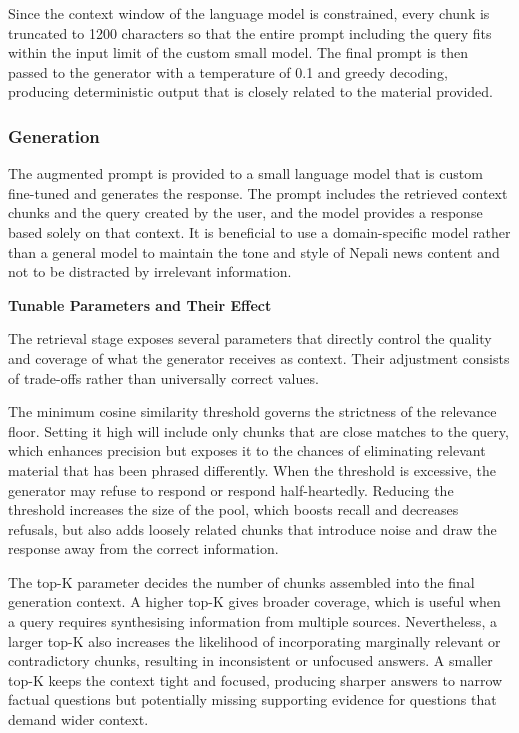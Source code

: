 Since the context window of the language model is constrained, every chunk is truncated to 1200 characters so that the entire prompt including the query fits within the input limit of the custom small model. The final prompt is then passed to the generator with a temperature of 0.1 and greedy decoding, producing deterministic output that is closely related to the material provided.

\subsubsection{Generation}

The augmented prompt is provided to a small language model that is custom fine-tuned and generates the response. The prompt includes the retrieved context chunks and the query created by the user, and the model provides a response based solely on that context. It is beneficial to use a domain-specific model rather than a general model to maintain the tone and style of Nepali news content and not to be distracted by irrelevant information.

\textbf{Tunable Parameters and Their Effect}

The retrieval stage exposes several parameters that directly control the quality and coverage of what the generator receives as context. Their adjustment consists of trade-offs rather than universally correct values.

The minimum cosine similarity threshold governs the strictness of the relevance floor. Setting it high will include only chunks that are close matches to the query, which enhances precision but exposes it to the chances of eliminating relevant material that has been phrased differently. When the threshold is excessive, the generator may refuse to respond or respond half-heartedly. Reducing the threshold increases the size of the pool, which boosts recall and decreases refusals, but also adds loosely related chunks that introduce noise and draw the response away from the correct information.

The top-K parameter decides the number of chunks assembled into the final generation context. A higher top-K gives broader coverage, which is useful when a query requires synthesising information from multiple sources. Nevertheless, a larger top-K also increases the likelihood of incorporating marginally relevant or contradictory chunks, resulting in inconsistent or unfocused answers. A smaller top-K keeps the context tight and focused, producing sharper answers to narrow factual questions but potentially missing supporting evidence for questions that demand wider context.

